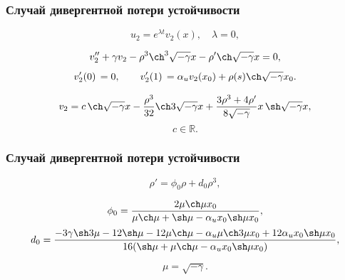 \documentclass[fullscreen=true, unicode, bookmarks=false]{beamer}
\begin{document}
\begin{frame}
\frametitle{ Случай дивергентной потери устойчивости }

$$ u_2 = e^{\lambda t}v_2(x), \quad \lambda = 0, $$

\medskip
\pause

\begin{equation}
	v_2'' + \gamma v_2 - \rho^3 \ch^3 \sqrt{-\gamma} x - \rho' \ch \sqrt{-\gamma} x = 0,
\end{equation}
\begin{equation}
	v_2'(0) \, = 0, \qquad v_2'(1) \, = \alpha_u v_2(x_0) + \rho(s) \ch \sqrt{-\gamma} x_0.
\end{equation}

\medskip
\pause

$$ v_2 = c \, \ch \sqrt{-\gamma} x - \frac{\rho^3}{32} \ch 3\sqrt{-\gamma} x + \frac{3\rho^3 + 4\rho'}{8\sqrt{-\gamma}} x \, \sh \sqrt{-\gamma} x, $$
$$ c \in \mathbb{R}. $$

\end{frame}

\begin{frame}
\frametitle{ Случай дивергентной потери устойчивости }

\begin{equation}
	\rho' = \phi_0 \rho + d_0 \rho^3,
\end{equation}

\bigskip
\pause

$$ \phi_0 = \frac{ 2 \mu \ch \mu x_0 }{ \mu \ch \mu +\sh \mu - \alpha_u x_0 \sh \mu x_0 }, $$
$$ d_0 = \frac{ -3\gamma \sh 3\mu - 12 \sh \mu - 12 \mu \ch \mu - \alpha_u \mu \ch 3\mu x_0 + 12 \alpha_u x_0 \sh \mu x_0 }{ 16( \sh \mu + \mu \ch \mu - \alpha_u x_0 \sh \mu x_0 ) }, $$

$$ \mu = \sqrt{-\gamma}. $$

\end{frame}
\end{document}
